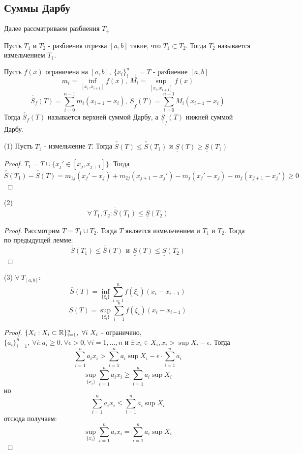 \subsection{Суммы Дарбу}
Далее рассматриваем разбиения $T_+$
\begin{definition}
    Пусть $T_{1}$ и $T_{2}$ - разбиения отрезка $[a,b]$ такие, что $T_1\subset T_2$. Тогда $T_2$ называется измельчением $T_1$.
\end{definition} 
\begin{definition}
    Пусть $f(x)$ ограничена на $[a,b],\ \{x_i\}_{i=1}^n=T$ - разбиение $[a,b]$
    \[m_i=\inf\limits_{[x_i, x_{i+1}]} f(x),\ M_i=\sup\limits_{[x_i, x_{i+1}]}f(x)\] 
    \[\overline{\overline{S}}_f(T)=\sum\limits_{i=0}^{n-1}m_i(x_{i+1}-x_i),\ \underline{\underline{S}}_f(T)=\sum\limits_{i=0}^{n-1}M_i(x_{i+1}-x_i)\]
    Тогда $\overline{\overline{S}}_f(T)$ называется верхней суммой Дарбу, а $\underline{\underline{S}}_f(T)$ нижней суммой Дарбу.
\end{definition} 
\begin{lemma} (1)
    Пусть $T_1$ - измельчение $T$. Тогда $\overline{\overline{S}}(T)\leq \overline{\overline{S}}(T_1)$ и $\underline{\underline{S}}(T)\geq \underline{\underline{S}}(T_1)$
\end{lemma} 
\begin{proof}
    $T_1=T\cup \{x_j'\in [x_j, x_{j+1}]\}$. Тогда \[\overline{\overline{S}}(T_1)-\overline{\overline{S}}(T)=m_{1j}(x_j'-x_j)+m_{2j}(x_{j+1}-x_j')-m_j(x_j'-x_j)-m_j(x_{j+1}-x_j')\geq 0\]
\end{proof} 
\begin{lemma} (2) 
    \[\forall\ T_1, T_2: \overline{\overline{S}}(T_1)\leq \underline{\underline{S}}(T_2)\]
\end{lemma} 
\begin{proof}
    Рассмотрим $T=T_1\cup T_2$. Тогда $T$ является измельчением и $T_1$ и $T_2$. Тогда по предыдущей лемме:
    \[\overline{\overline{S}}(T_1)\leq \overline{\overline{S}}(T)\ \ \text{и}\ \ \underline{\underline{S}}(T)\leq \underline{\underline{S}}(T_2)\]
\end{proof} 
\begin{lemma} (3) $\forall\ T_{[a,b]}:$
    \[\overline{\overline{S}}(T)=\inf\limits_{\{\xi_i\}}\sum\limits_{i=1}^{n}f(\xi_i)(x_i-x_{i-1})\]
    \[\underline{\underline{S}}(T)=\sup\limits_{\{\xi_i\}}\sum\limits_{i=1}^{n}f(\xi_i)(x_i-x_{i-1})\]
\end{lemma} 
\begin{proof}
    $\{X_i: X_i\subset \mathbb{R}\}_{i=1}^n,\ \forall i\ X_i$ - ограничено,\\
    $\{a_i\}_{i=1}^n,\ \forall i: a_i\geq 0.\ \forall \epsilon>0, \forall i=1,\dots,n$ и $\exists\ x_i\in X_i, x_i>\sup X_i-\epsilon$. Тогда 
    \[\sum\limits_{i=1}^{n}a_i x_i>\sum\limits_{i=1}^{n}a_i \sup X_i-\epsilon\cdot \sum\limits_{i=1}^{n}a_i\] 
    \[\sup\limits_{\{x_i\}} \sum\limits_{i=1}^{n}a_i x_i\geq \sum\limits_{i=1}^{n}a_i \sup X_i\]
    но 
    \[\sum\limits_{i=1}^{n}a_i x_i \leq \sum\limits_{i=1}^{n} a_i\sup X_i\]
    отсюда получаем:
    \[\sup\limits_{\{x_i\}} \sum\limits_{i=1}^{n}a_i x_i=\sum\limits_{i=1}^{n}a_i \sup X_i\]
\end{proof} 
